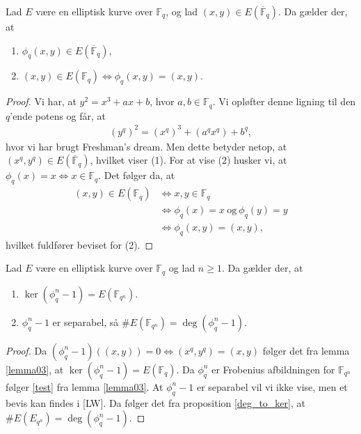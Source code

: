 \begin{lemma}
\label{lemma03}
Lad $E$ være en elliptisk kurve over $\mathbb{F}_q$, og lad 
$(x, y) \in E(\overline{\mathbb{F}}_q)$. Da gælder der, at 
\begin{enumerate}
	\item $\phi_q(x, y) \in E(\overline{\mathbb{F}}_q)$,
	\item $(x, y) \in E(\mathbb{F}_q) \Leftrightarrow \phi_q(x, y)=(x, y)$.
\end{enumerate}
\end{lemma}
\begin{proof}
Vi har, at $y^2 = x^3 + ax + b$, hvor $a, b \in \mathbb{F}_q$. Vi opløfter 
denne ligning til den $q$'ende potens og får, at 
\begin{align*}
	(y^q)^2 = (x^q)^3 + (a^q x^q) + b^q,
\end{align*}
hvor vi har brugt Freshman's dream. Men dette betyder netop, at 
$(x^q, y^q) \in E(\overline{\mathbb{F}}_q)$, hvilket viser (1).
For at vise (2) husker vi, at $\phi_q(x) = x \Leftrightarrow x \in \mathbb{F}_q$.
Det følger da, at 
\begin{align*}
	(x, y) \in E(\mathbb{F}_q) &\Leftrightarrow x, y \in \mathbb{F}_q \\
	&\Leftrightarrow \phi_q(x) = x \ \text{og} \ \phi_q(y) = y \\
	&\Leftrightarrow \phi_q(x, y) = (x, y),
\end{align*}
hvilket fuldfører beviset for (2).
\end{proof}

\begin{proposition}
Lad $E$ være en elliptisk kurve over $\mathbb{F}_q$ og lad $n \geq 1$. Da gælder der,
at 
\begin{enumerate}
	\item $\ker (\phi_{q}^n - 1) = E(\mathbb{F}_{q^n})$. \label{test}
	\item $\phi_{q}^{n}-1$ er separabel, så $\#E(\mathbb{F}_{q^n})=\deg (\phi_{q}^{n}-1)$. 
\end{enumerate}
\end{proposition}
\begin{proof}
Da $(\phi_{q}^{n} - 1)((x,y)) = 0 \Leftrightarrow (x^q, y^q) = (x, y)$ følger det fra
lemma \ref{lemma03}, at $\ker(\phi_{q}^{n}-1)=E(\mathbb{F}_q)$.
Da $\phi_{q}^{n}$ er Frobenius afbildningen for $\mathbb{F}_{q^n}$ følger \eqref{test} fra lemma \ref{lemma03}. At $\phi_{q}^{n} -1$ er separabel vil vi ikke vise, men et bevis kan findes
i [LW]. Da følger det fra proposition \ref{deg_to_ker}, at $\#E(E_{q^n})=\deg(\phi_{q}^{n} -1)$.
\end{proof}


